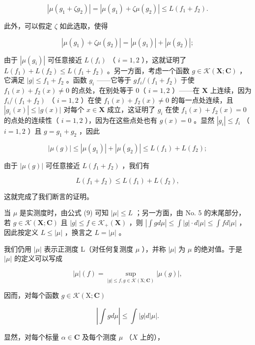 \[
\left| \mu (g _ {1} + \zeta g _ {2}) \right| = \left| \mu (g _ {1}) + \zeta \mu (g _ {2}) \right| \leqslant L (f _ {1} + f _ {2}).
\]

此外，可以假定 \(\zeta\) 如此选取，使得

\[
\left| \mu (g _ {1}) + \zeta \mu (g _ {2}) \right| = \left| \mu (g _ {1}) \right| + \left| \mu (g _ {2}) \right|;
\]

由于 \(|\mu(g_i)|\) 可任意接近 \(L(f_i)\) （ \(i = 1,2\) ），这就证明了 \(L(f_1) + L(f_2) \leqslant L(f_1 + f_2)\) 。另一方面，考虑一个函数 \(g \in \mathcal{K}(\mathbf{X};\mathbf{C})\) ，它满足 \(|g| \leqslant f_1 + f_2\) 。函数 \(g_i\) ——它等于 \(g f_i / (f_1 + f_2)\) 于使 \(f_1(x) + f_2(x) \neq 0\) 的点处，在别处等于 0（ \(i = 1,2\) ）——在 \(\mathbf{X}\) 上连续，因为 \(f_i / (f_1 + f_2)\) （ \(i = 1,2\) ）在使 \(f_1(x) + f_2(x) \neq 0\) 的每一点处连续，且 \(|g_i(x)| \leqslant |g(x)|\) 对每个 \(x \in \mathbf{X}\) 成立，这证明了 \(g_i\) 在使 \(f_1(x) + f_2(x) = 0\) 的点处的连续性（ \(i = 1,2\) ），因为在这些点处也有 \(g(x) = 0\) 。显然 \(|g_i| \leqslant f_i\) （ \(i = 1,2\) ）且 \(g = g_1 + g_2\) ，因此

\[
| \mu (g) | \leqslant | \mu (g _ {1}) | + | \mu (g _ {2}) | \leqslant L (f _ {1}) + L (f _ {2});
\]

由于 \(|\mu(g)|\) 可任意接近 \(L(f_1 + f_2)\) ，我们有

\[
L (f _ {1} + f _ {2}) \leqslant L (f _ {1}) + L (f _ {2}),
\]

这就完成了我们断言的证明。

当 \(\mu\) 是实测度时，由公式 (9) 可知 \(|\mu| \leqslant L\) ；另一方面，由 No. 5 的末尾部分，若 \(g \in \mathcal{K}(\mathbf{X}; \mathbf{C})\) 且 \(|g| \leqslant f \in \mathcal{K}_{+}(\mathbf{X})\) ，则 \(|\int g d\mu| \leqslant \int |g| \cdot d|\mu| \leqslant \int f d|\mu|\) ，因此按定义 \(L \leqslant |\mu|\) ，换言之 \(L = |\mu|\) 。

我们仍用 \(|\mu|\) 表示正测度 L（对任何复测度 \(\mu\) ），并称 \(|\mu|\) 为 \(\mu\) 的绝对值。于是 \(|\mu|\) 的定义可以写成

\[
| \mu | (f) = \sup _ {| g | \leqslant f, g \in \mathcal{K} (\mathrm{X}; \mathbf {C})} | \mu (g) |,\tag{12}
\]

因而，对每个函数 \(g \in \mathcal{K}(\mathrm{X};\mathbf{C})\)

\[
\left| \int g d \mu \right| \leqslant \int | g | d | \mu |.\tag{13}
\]

显然，对每个标量 \(\alpha \in \mathbf{C}\) 及每个测度 \(\mu\) （\(X\) 上的），

